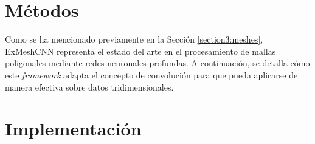\section{Métodos}
\label{section4:methods}
Como se ha mencionado previamente en la Sección \ref{section3:meshes}, ExMeshCNN \cite{kim_exmeshcnn_2022} representa el estado del arte en el procesamiento de mallas poligonales mediante redes neuronales profundas. A continuación, se detalla cómo este \textit{framework} adapta el concepto de convolución para que pueda aplicarse de manera efectiva sobre datos tridimensionales.



\section{Implementación}
\label{section4:implementation}